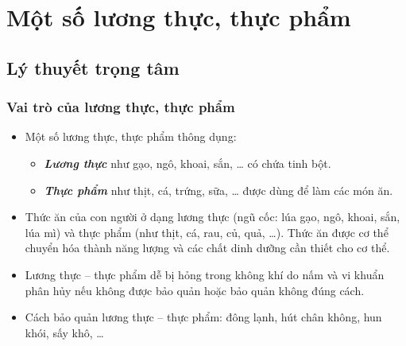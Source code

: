 \documentclass[Main.tex]{subfiles}
\begin{document}
\section{Một số lương thực, thực phẩm}
\subsection{Lý thuyết trọng tâm}
\begin{kienthuccannho}
	\subsubsection{Vai trò của lương thực, thực phẩm}
	\begin{itemize}
		\item Một số lương thực, thực phẩm thông dụng:
		\begin{itemize}
			\item \textbf{\textit{Lương thực}} như gạo, ngô, khoai, sắn, … có chứa tinh bột.
			\item \textbf{\textit{Thực phẩm}} như thịt, cá, trứng, sữa, … được dùng để làm các món ăn.
		\end{itemize}
		\item Thức ăn của con người ở dạng lương thực (ngũ cốc: lúa gạo, ngô, khoai, sắn, lúa mì) và thực phẩm (như thịt, cá, rau, củ, quả, …). Thức ăn được cơ thể chuyển hóa thành năng lượng và các chất dinh dưỡng cần thiết cho cơ thể.
		\item Lương thực -- thực phẩm dễ bị hỏng trong không khí do nấm và vi khuẩn phân hủy nếu không được bảo quản hoặc bảo quản không đúng cách.
		\item Cách bảo quản lương thực -- thực phẩm: đông lạnh, hút chân không, hun khói, sấy khô, …
	\end{itemize}

\end{kienthuccannho}
\end{document}
